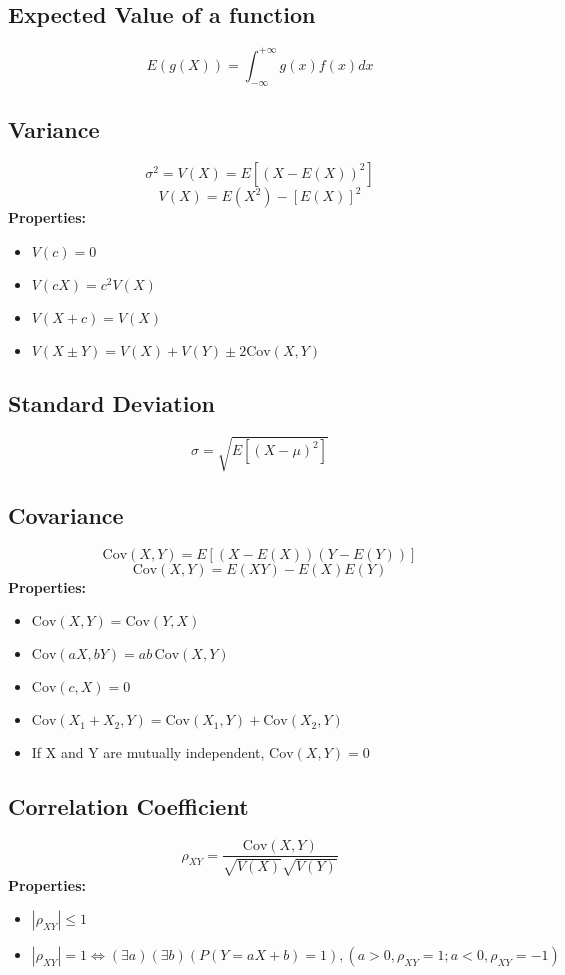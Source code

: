 \documentclass{article}
\begin{document}
\subsection{Expected Value of a function}
\[
    E(g(X)) = \int_{-\infty}^{+\infty} g(x)f(x)dx
\]

\subsection{Variance}
\[
    \sigma^2 = V(X) = E[(X - E(X))^2]
\]
\[
    V(X) = E(X^2) - [E(X)]^2
\]
\textbf{Properties:}
\begin{itemize}
    \item \( V(c) = 0 \)
    \item \( V(cX) = c^2 V(X) \)
    \item \( V(X+c) = V(X) \)
    \item \( V(X \pm Y) = V(X) + V(Y) \pm 2\text{Cov}(X,Y) \)
\end{itemize}

\subsection{Standard Deviation}
\[
    \sigma = \sqrt{E[(X-\mu)^2]}
\]

\subsection{Covariance}
\[
    \text{Cov}(X,Y) = E[(X-E(X))(Y-E(Y))]
\]
\[
    \text{Cov}(X,Y) = E(XY) - E(X)E(Y)
\]
\textbf{Properties:}
\begin{itemize}
    \item \( \text{Cov}(X,Y) = \text{Cov}(Y,X) \)
    \item \( \text{Cov}(aX, bY) = ab\,\text{Cov}(X,Y) \)
    \item \( \text{Cov}(c,X) = 0 \)
    \item \( \text{Cov}(X_1+X_2, Y) = \text{Cov}(X_1,Y) + \text{Cov}(X_2,Y) \)
    \item If X and Y are mutually independent, \( \text{Cov}(X,Y) = 0 \)
\end{itemize}

\subsection{Correlation Coefficient}
\[
    \rho_{XY} = \frac{\text{Cov}(X,Y)}{\sqrt{V(X)}\sqrt{V(Y)}}
\]
\textbf{Properties:}
\begin{itemize}
    \item \( |\rho_{XY}| \le 1 \)
    \item \( |\rho_{XY}| = 1 \Leftrightarrow (\exists a)(\exists b)(P(Y=aX+b)=1), (a>0, \rho_{XY}=1; a<0, \rho_{XY}=-1) \)
\end{itemize}
\end{document}
